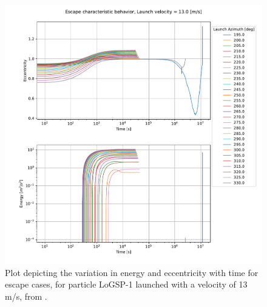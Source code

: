 \begin{figure}[htb]
\centering
\captionsetup{justification=centering}
\includegraphics[width=\textwidth, height=0.4\textheight, keepaspectratio=true]{trailing_edge_perturbations/logsp1_escape_energy_ecc_13ms_solarPhase225.pdf}
\caption{Plot depicting the variation in energy and eccentricity with time for escape cases, for particle LoGSP-1 launched with a velocity of 13 m/s, from \protect{}.}
\label{fig:trailingEdge_logsp1_escape_energy_ecc_13ms_solar225}
\end{figure}
\FloatBarrier
